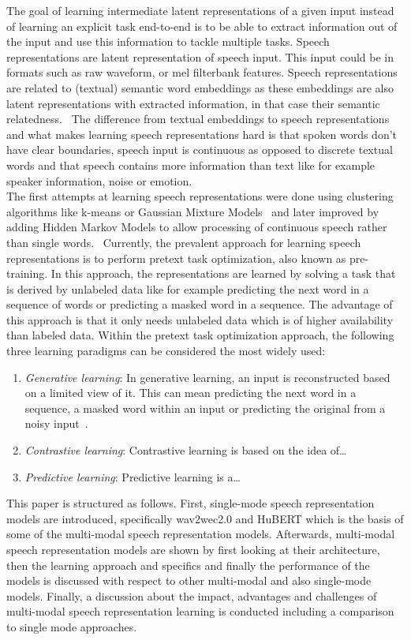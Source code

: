 The goal of learning intermediate latent representations of a given input instead of learning an explicit task end-to-end is to be able to extract information out of the input and use this information to tackle multiple tasks. Speech representations are latent representation of speech input. This input could be in formats such as raw waveform, or mel filterbank features. Speech representations are related to (textual) semantic word embeddings as these embeddings are also latent representations with extracted information, in that case their semantic relatedness.~\cite{glove} The difference from textual embeddings to speech representations and what makes learning speech representations hard is that spoken words don't have clear boundaries, speech input is continuous as opposed to discrete textual words and that speech contains more information than text like for example speaker information, noise or emotion.\\The first attempts at learning speech representations were done using clustering algorithms like k-means or Gaussian Mixture Models~\cite{clustering} and later improved by adding Hidden Markov Models to allow processing of continuous speech rather than single words.~\cite{HMMs} Currently, the prevalent approach for learning speech representations is to perform pretext task optimization, also known as pre-training. In this approach, the representations are learned by solving a task that is derived by unlabeled data like for example predicting the next word in a sequence of words or predicting a masked word in a sequence. The advantage of this approach is that it only needs unlabeled data which is of higher availability than labeled data. Within the pretext task optimization approach, the following three learning paradigms can be considered the most widely used:
\begin{enumerate}
    \item \textit{Generative learning}: In generative learning, an input is reconstructed based on a limited view of it. This can mean predicting the next word in a sequence, a masked word within an input or predicting the original from a noisy input~\cite{denoising-autoencoder}.
    \item \textit{Contrastive learning}: Contrastive learning is based on the idea of\ldots
    \item \textit{Predictive learning}: Predictive learning is a\ldots
\end{enumerate}
This paper is structured as follows. First, single-mode speech representation models are introduced, specifically wav2wec2.0 and HuBERT which is the basis of some of the multi-modal speech representation models. Afterwards, multi-modal speech representation models are shown by first looking at their architecture, then the learning approach and specifics and finally the performance of the models is discussed with respect to other multi-modal and also single-mode models. Finally, a discussion about the impact, advantages and challenges of multi-modal speech representation learning is conducted including a comparison to single mode approaches.
